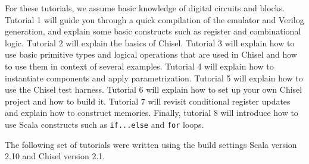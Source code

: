 For these tutorials, we assume basic knowledge of digital circuits and blocks. 
Tutorial 1 will guide you through a quick compilation of the emulator and Verilog generation, and explain some basic constructs such as register and combinational logic.
Tutorial 2 will explain the basics of Chisel.
Tutorial 3 will explain how to use basic primitive types and logical operations that are used in Chisel and how to use them in context of several examples. 
Tutorial 4 will explain how to instantiate components and apply parametrization. 
Tutorial 5 will explain how to use the Chisel test harness. 
Tutorial 6 will explain how to set up your own Chisel project and how to build it.
Tutorial 7 will revisit conditional register updates and explain how to construct memories.
Finally, tutorial 8 will introduce how to use Scala constructs such as \verb+if...else+ and \verb+for+ loops.

The following set of tutorials were written using the build settings Scala version 2.10 and Chisel version 2.1.
